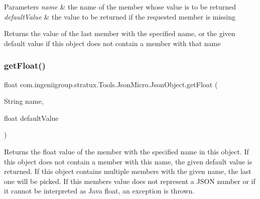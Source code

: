 \begin{DoxyParams}{Parameters}
{\em name} & the name of the member whose value is to be returned \\
\hline
{\em default\+Value} & the value to be returned if the requested member is missing \\
\hline
\end{DoxyParams}
\begin{DoxyReturn}{Returns}
the value of the last member with the specified name, or the given default value if this object does not contain a member with that name 
\end{DoxyReturn}
\mbox{\label{classcom_1_1ingeniigroup_1_1stratux_1_1_tools_1_1_json_micro_1_1_json_object_a2045302012abc94aab8554062c12f991}} 
\subsubsection{\texorpdfstring{get\+Float()}{getFloat()}}
{\footnotesize\ttfamily float com.\+ingeniigroup.\+stratux.\+Tools.\+Json\+Micro.\+Json\+Object.\+get\+Float (\begin{DoxyParamCaption}\item[{String}]{name,  }\item[{float}]{default\+Value }\end{DoxyParamCaption})}

Returns the {\ttfamily float} value of the member with the specified name in this object. If this object does not contain a member with this name, the given default value is returned. If this object contains multiple members with the given name, the last one will be picked. If this member\textquotesingle{}s value does not represent a J\+S\+ON number or if it cannot be interpreted as Java {\ttfamily float}, an exception is thrown.


